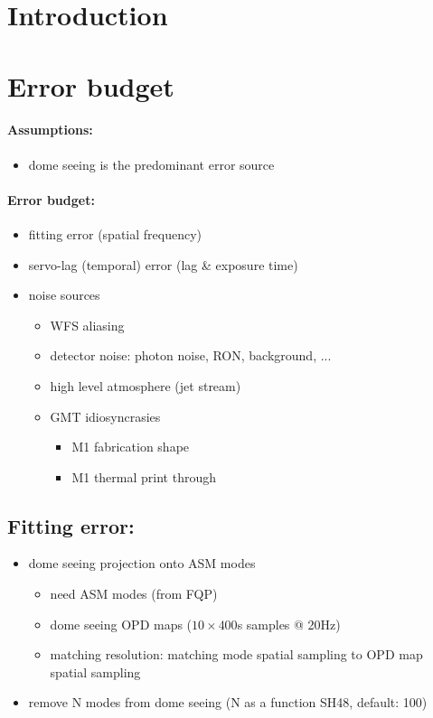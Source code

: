 \documentclass{gmto}
\begin{document}
\section{Introduction}
\label{sec:introduction}

\section{Error budget}
\label{sec:error-budget}

\paragraph{Assumptions:}
\begin{itemize}
\item dome seeing is the predominant error source
\end{itemize}

\paragraph{Error budget:}
\begin{itemize}
\item fitting error (spatial frequency)
\item servo-lag (temporal) error (lag \& exposure time)
\item noise sources
  \begin{itemize}
  \item WFS aliasing
  \item detector noise: photon noise, RON, background, ...
  \item high level atmosphere (jet stream)
  \item GMT idiosyncrasies
    \begin{itemize}
    \item M1 fabrication shape
    \item M1 thermal print through
    \end{itemize}
  \end{itemize}
\end{itemize}

\subsection{Fitting error:}
\label{sec:fitting}

\begin{itemize}
\item dome seeing projection onto ASM modes
  \begin{itemize}
  \item need ASM modes (from FQP)
  \item dome seeing OPD maps ($10\times 400$s samples @ 20Hz)
  \item matching resolution: matching mode spatial sampling to OPD map spatial sampling
  \end{itemize}
\item remove N modes from dome seeing (N as a function SH48, default: 100)
\end{itemize}
\end{document}
